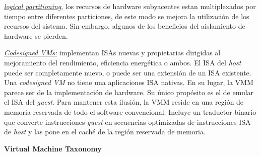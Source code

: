 \underline{\textit{logical partitioning}}, los recursos de hardware subyacentes estan multiplexados por tiempo entre diferentes particiones, de este modo se mejora la utilización de los recursos del sistema. Sin embargo, algunos de los beneficios del aislamiento de hardware se pierden. 

\underline{\textit{Codesigned VMs:}} implementan ISAs nuevas y propietarias dirigidas al mejoramiento del rendimiento, eficiencia energética o ambos. El ISA del \textit{host} puede ser completamente nuevo, o puede ser una extensión de un ISA existente. Una \emph{codesigned VM} no tiene una aplicaciones ISA nativas. En su lugar, la VMM parece ser de la implementación de hardware. Su único propósito es el de emular el ISA del \emph{guest}. Para mantener esta ilusión, la VMM reside en una región de memoria reservada de todo el software convencional. Incluye un traductor binario que converte instrucciones \emph{guest} en secuencias optimizadas de instrucciones ISA de \emph{host} y las pone en el caché de la región reservada de memoria.

\vspace{0.14cm}

\textbf{Virtual Machine Taxonomy}
\vspace{0.12cm}

